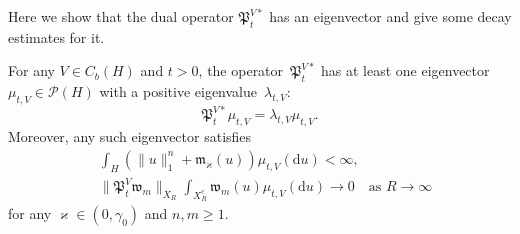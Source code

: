 \documentclass[10pt]{amsart}
\theoremstyle{definition}\newtheorem{defi}[theo]{Definition}\newtheorem{rema}[theo]{Remark}\newtheorem{exam}[theo]{Example}\newtheorem{exem}[theo]{Example}\newtheorem{nota}[theo]{Notation}
\newcommand{\PP}{{\mathcal P}}
\newcommand{\vk}{{\varkappa}}
\newcommand{\wwww}{{\mathfrak w}}
\newcommand{\mm}{{\mathfrak m}}
\newcommand{\PPPP}{{\mathfrak P}}
\newcommand{\dd}{\mathrm{d}}
\begin{document}
Here we show that the dual operator $\PPPP_t^{V*}$ has an eigenvector and give some decay estimates for it.

\begin{prop}\label{P:2.8}
For any $V\in C_b(H)$ and $t>0$, the operator~$\PPPP_t^{V*}$ has at least one eigenvector $\mu_{t,V}\in\PP(H)$ with a positive eigenvalue~$\lambda_{t,V}$:
\begin{equation}\label{6.22}
\PPPP_t^{V*}\mu_{t,V}=\lambda_{t,V}\mu_{t,V}.
\end{equation}
Moreover, any such eigenvector satisfies
\begin{align}
& \int_{H} \left(\|u\|_1^{n} + \mm_\vk (u) \right) \mu_{t,V}(\dd u)<\infty, \label{6.23}\\
&\|\PPPP_t^V\wwww_m\|_{ X_R }\int_{X_R^c}\wwww_m(u)\mu_{t,V}(\dd u)\to0\quad\text{as $R\to\infty$} \label{6.24}
\end{align}
for any $\vk\in (0,\gamma_0)$ and $n,m\ge1$.
\end{prop}
\end{document}
